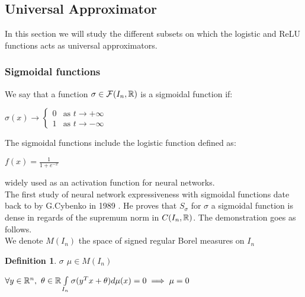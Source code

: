 \documentclass[12pt, a4paper]{article}
\newtheorem{definition}{Definition}
\begin{document}
\subsection{Universal Approximator}

In this section we will study the different subsets on which the logistic and ReLU functions acts as universal approximators.\\ 

\subsubsection{Sigmoidal functions}

We say that a function $\sigma \in \mathcal{F}(I_n, \mathbb{R})$ is a sigmoidal function if:\\

\begin{center}
  $\sigma(x) \to
  \begin{cases}
    0 &\text{as $t \to +\infty$}\\
    1 &\text{as $t \to -\infty$}
  \end{cases}$
\end{center}

The sigmoidal functions include the logistic function defined as:\\

\begin{center}
  $f(x) = \frac{1}{1+e^{-x}}$
\end{center}

widely used as an activation function for neural networks.\\

The first study of neural network expressiveness with sigmoidal functions date back to by G.Cybenko in 1989 \cite{cybenko_approximation_1989}. He proves that $S_\sigma$ for $\sigma$ a sigmoidal function is dense in regards of the supremum norm in $C(I_n, \mathbb{R})$. The demonstration goes as follows.\\

We denote $M(I_n)$ the space of signed regular Borel measures on $I_n$\\

\begin{definition}
  $\sigma$  $\mu \in M(I_n)$ \\ 
  \begin{center}
  $\forall y \in \mathbb{R}^n,$ $\theta \in \mathbb{R} \int\limits_{I_n} \sigma(y^Tx + \theta) d\mu(x) = 0 \implies \mu = 0$
\end{center}
\end{definition}
\end{document}

